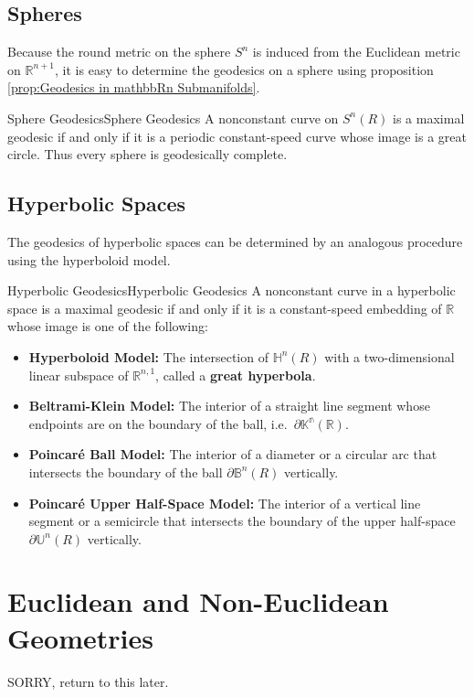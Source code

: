 \documentclass[../main.tex]{subfiles}
\begin{document}
\subsection{Spheres}
Because the round metric on the sphere $S^n$ is induced from the Euclidean metric on $\mathbb{R}^{n+1}$, it is easy to determine the geodesics on a sphere using proposition \ref{prop:Geodesics in mathbbRn Submanifolds}.

\begin{proposition}{Sphere Geodesics}{Sphere Geodesics}
	A nonconstant curve on $S^n(R)$ is a maximal geodesic if and only if it is a periodic constant-speed curve whose image is a great circle. Thus every sphere is geodesically complete. 
\end{proposition}

\subsection{Hyperbolic Spaces}
The geodesics of hyperbolic spaces can be determined by an analogous procedure using the hyperboloid model.

\begin{proposition}{Hyperbolic Geodesics}{Hyperbolic Geodesics}
	A nonconstant curve in a hyperbolic space is a maximal geodesic if and only if it is a constant-speed embedding of $\mathbb{R}$ whose image is one of the following: 
	\begin{itemize}
		\item \textbf{Hyperboloid Model: } The intersection of $\mathbb{H}^n(R)$ with a two-dimensional linear subspace of $\mathbb{R}^{n,1}$, called a \textbf{great hyperbola}.
		\item \textbf{Beltrami-Klein Model: } The interior of a straight line segment whose endpoints are on the boundary of the ball, i.e.\ $\partial \mathbb{K^n(R)}$.
		\item \textbf{Poincaré Ball Model: } The interior of a diameter or a circular arc that intersects the boundary of the ball $\partial \mathbb{B}^n(R)$ vertically.
		\item \textbf{Poincaré Upper Half-Space Model: } The interior of a vertical line segment or a semicircle that intersects the boundary of the upper half-space $\partial \mathbb{U}^n(R)$ vertically.
	\end{itemize}
\end{proposition}

\section{Euclidean and Non-Euclidean Geometries}
SORRY, return to this later.
\end{document}
